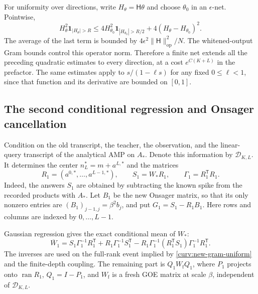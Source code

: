 \documentclass[11pt,reqno]{amsart}
\begin{document}
For uniformity over directions, write $H_\theta=\mathsf H\theta$ and
choose $\theta_0$ in an $\epsilon$-net. Pointwise,
\[
 H_\theta^2\mathbf1_{|H_\theta|>R}
 \le4H_{\theta_0}^2\mathbf1_{|H_{\theta_0}|>R/2}
                       +4(H_\theta-H_{\theta_0})^2.
\]
The average of the last term is bounded by
$4\epsilon^2\|\mathsf H\|_{\mathrm{op}}^2/N$. The whitened-output Gram
bounds control this operator norm. Therefore a finite net extends all
the preceding quadratic estimates to every direction, at a cost
$e^{C(K+L)}$ in the prefactor. The same estimates apply to
$s/(1-\ell s)$ for any fixed $0\le\ell<1$, since that function and its
derivative are bounded on $[0,1]$.

\subsection{The second conditional regression and Onsager cancellation}
\label{curv:second-regression}

Condition on the old transcript, the teacher, the observation, and the
linear-query transcript of the analytical AMP on $A_*$. Denote this
information by $\mathcal D_{K,L}$. It determines the center
$n_L^*=m+a^{L,*}$ and the matrices
\[
 R_1=(a^{0,*},\ldots,a^{L-1,*}),\qquad
 S_1=W_*R_1,\qquad \Gamma_1=R_1^{\mathsf T}R_1.
\]
Indeed, the answers $S_1$ are obtained by subtracting the known spike
from the recorded products with $A_*$. Let $B_1$ be the new Onsager
matrix, so that its only nonzero entries are
$(B_1)_{j-1,j}=\beta^2 b_j$, and put $G_1=S_1-R_1B_1$.
Here rows and columns are indexed by $0,\ldots,L-1$.

Gaussian regression gives the exact conditional mean of $W_*$:
\begin{equation}\label{curv:new-exact-mean}
 \overline W_1
 =S_1\Gamma_1^{-1}R_1^{\mathsf T}
   +R_1\Gamma_1^{-1}S_1^{\mathsf T}
   -R_1\Gamma_1^{-1}(R_1^{\mathsf T}S_1)
                         \Gamma_1^{-1}R_1^{\mathsf T}.
\end{equation}
The inverses are used on the full-rank event implied by
\eqref{curv:new-gram-uniform} and the finite-depth coupling. The remaining
part is $Q_1W_{\mathrm f}Q_1$, where $P_1$ projects onto
$\operatorname{ran}R_1$, $Q_1=I-P_1$, and $W_{\mathrm f}$ is a fresh GOE
matrix at scale $\beta$, independent of $\mathcal D_{K,L}$.
\end{document}
